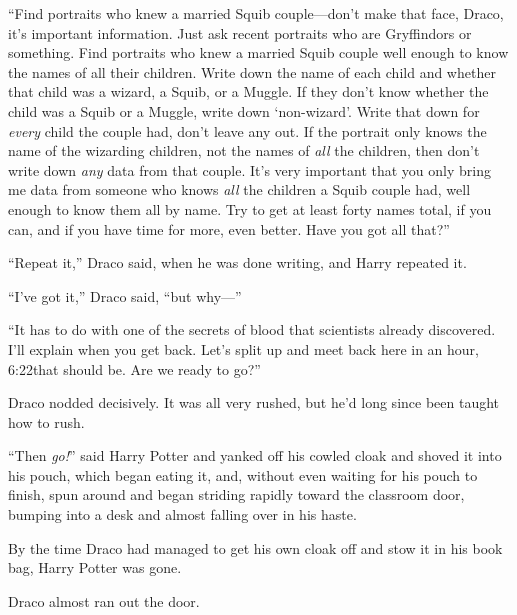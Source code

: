 “Find portraits who knew a married Squib couple—don’t make that face, Draco, it’s important information. Just ask recent portraits who are Gryffindors or something. Find portraits who knew a married Squib couple well enough to know the names of all their children. Write down the name of each child and whether that child was a wizard, a Squib, or a Muggle. If they don’t know whether the child was a Squib or a Muggle, write down ‘non-wizard’. Write that down for \emph{every} child the couple had, don’t leave any out. If the portrait only knows the name of the wizarding children, not the names of \emph{all} the children, then don’t write down \emph{any} data from that couple. It’s very important that you only bring me data from someone who knows \emph{all} the children a Squib couple had, well enough to know them all by name. Try to get at least forty names total, if you can, and if you have time for more, even better. Have you got all that?”

“Repeat it,” Draco said, when he was done writing, and Harry repeated it.

“I’ve got it,” Draco said, “but why—”

“It has to do with one of the secrets of blood that scientists already discovered. I’ll explain when you get back. Let’s split up and meet back here in an hour, 6:22\pm that should be. Are we ready to go?”

Draco nodded decisively. It was all very rushed, but he’d long since been taught how to rush.

“Then \emph{go!}” said Harry Potter and yanked off his cowled cloak and shoved it into his pouch, which began eating it, and, without even waiting for his pouch to finish, spun around and began striding rapidly toward the classroom door, bumping into a desk and almost falling over in his haste.

By the time Draco had managed to get his own cloak off and stow it in his book bag, Harry Potter was gone.

Draco almost ran out the door.

